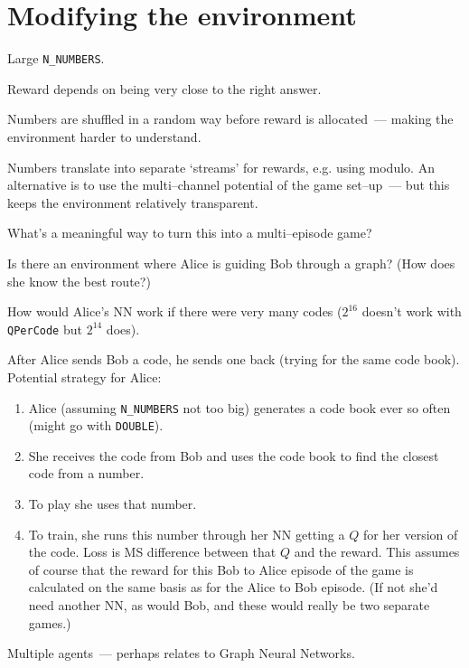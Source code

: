 \documentclass[12pt]{article}
\begin{document}
\section{Modifying the environment}

\begin{enumerate}

\todot Large \verb|N_NUMBERS|.

\todo Reward depends on being very close to the right answer.

\todot Numbers are shuffled in a random way before reward is allocated~--- making the environment harder to understand.

\todo Numbers translate into separate `streams' for rewards, e.g. using modulo.  An alternative is to use the multi--channel potential of the game set--up~--- but this keeps the environment relatively transparent. 

\todo What's a meaningful way to turn this into a multi--episode game?

\todo Is there an environment where Alice is guiding Bob through a graph?  (How does she know the best route?)

\todo How would Alice's NN work if there were very many codes ($2^{16}$ doesn't work with \verb|QPerCode| but $2^{14}$ does).

\todo After Alice sends Bob a code, he sends one back (trying for the same code book). Potential strategy for Alice:

	\begin{enumerate}
		
		\item Alice (assuming \verb|N_NUMBERS| not too big) generates a code book ever so often (might go with \verb|DOUBLE|).
		
		\item She receives the code from Bob and uses the code book to find the closest code from a number.
		
		\item To play she uses that number.
		
		\item To train, she  runs this number through her NN getting a $Q$ for her version of the code.  Loss is MS difference between that $Q$ and the reward.  This assumes of course that the reward for this Bob to Alice episode of the game is calculated on the same basis as for the Alice to Bob episode.  (If not she'd need another NN, as would Bob, and these would really be two separate games.)
		
	\end{enumerate}

\todo Multiple agents~--- perhaps relates to Graph Neural Networks.

\end{enumerate}





\end{document}
